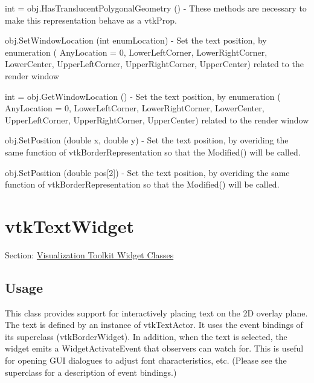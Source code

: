 \begin{DoxyItemize}
\item {\ttfamily int = obj.\-Has\-Translucent\-Polygonal\-Geometry ()} -\/ These methods are necessary to make this representation behave as a vtk\-Prop.  
\item {\ttfamily obj.\-Set\-Window\-Location (int enum\-Location)} -\/ Set the text position, by enumeration ( Any\-Location = 0, Lower\-Left\-Corner, Lower\-Right\-Corner, Lower\-Center, Upper\-Left\-Corner, Upper\-Right\-Corner, Upper\-Center) related to the render window  
\item {\ttfamily int = obj.\-Get\-Window\-Location ()} -\/ Set the text position, by enumeration ( Any\-Location = 0, Lower\-Left\-Corner, Lower\-Right\-Corner, Lower\-Center, Upper\-Left\-Corner, Upper\-Right\-Corner, Upper\-Center) related to the render window  
\item {\ttfamily obj.\-Set\-Position (double x, double y)} -\/ Set the text position, by overiding the same function of vtk\-Border\-Representation so that the Modified() will be called.  
\item {\ttfamily obj.\-Set\-Position (double pos\mbox{[}2\mbox{]})} -\/ Set the text position, by overiding the same function of vtk\-Border\-Representation so that the Modified() will be called.  
\end{DoxyItemize}\hypertarget{vtkwidgets_vtktextwidget}{}\section{vtk\-Text\-Widget}\label{vtkwidgets_vtktextwidget}
Section\-: \hyperlink{sec_vtkwidgets}{Visualization Toolkit Widget Classes} \hypertarget{vtkwidgets_vtkxyplotwidget_Usage}{}\subsection{Usage}\label{vtkwidgets_vtkxyplotwidget_Usage}
This class provides support for interactively placing text on the 2\-D overlay plane. The text is defined by an instance of vtk\-Text\-Actor. It uses the event bindings of its superclass (vtk\-Border\-Widget). In addition, when the text is selected, the widget emits a Widget\-Activate\-Event that observers can watch for. This is useful for opening G\-U\-I dialogues to adjust font characteristics, etc. (Please see the superclass for a description of event bindings.)

